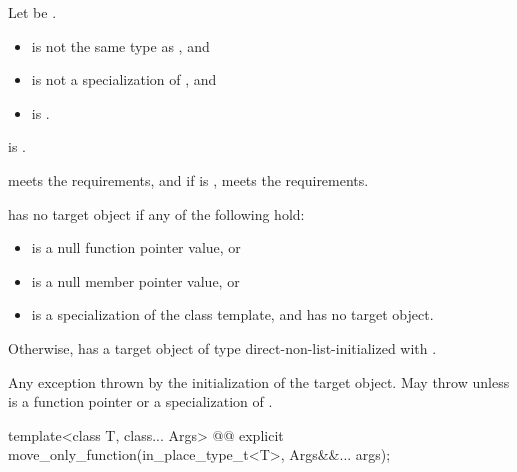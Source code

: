 \begin{itemdescr}
\pnum
Let  be .

\pnum
\constraints
\begin{itemize}
\item
{} is not the same type as , and
\item
{} is not a specialization of , and
\item
{} is .
\end{itemize}

\pnum
\mandates
{} is .

\pnum
\expects
{} meets the  requirements, and
if  is ,
 meets the  requirements.

\pnum
\ensures
{} has no target object if any of the following hold:
\begin{itemize}
\item
{} is a null function pointer value, or
\item
{} is a null member pointer value, or
\item
{} is a specialization of
the  class template,
and  has no target object.
\end{itemize}
Otherwise,  has a target object of type 
direct-non-list-initialized with .

\pnum
\throws
Any exception thrown by the initialization of the target object.
May throw  unless  is
a function pointer or a specialization of .
\end{itemdescr}

%
\begin{itemdecl}
template<class T, class... Args>
  @@ explicit move_only_function(in_place_type_t<T>, Args&&... args);
\end{itemdecl}

